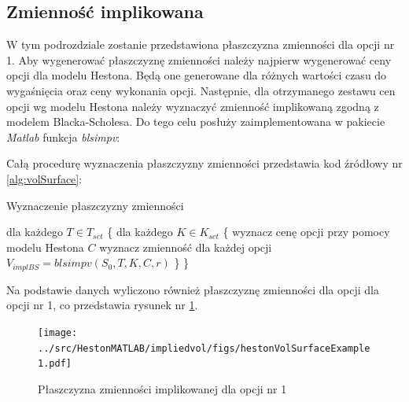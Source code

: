 \documentclass{pracamgr}
\begin{document}
\subsection{Zmienność implikowana}
W tym podrozdziale zostanie przedstawiona płaszczyzna zmienności dla opcji nr 1.
Aby wygenerować płaszczyznę zmienności należy najpierw wygenerować ceny opcji
dla modelu Hestona. Będą one generowane dla różnych wartości czasu do wygaśnięcia 
oraz ceny wykonania opcji. Następnie, dla otrzymanego zestawu cen opcji wg modelu 
Hestona należy wyznaczyć zmienność implikowaną zgodną z modelem Blacka-Scholesa.
Do tego celu posłuży zaimplementowana w pakiecie \textit{Matlab} funkcja \textit{blsimpv}:

Całą procedurę wyznaczenia płaszczyzny zmienności przedstawia kod źródłowy nr \ref{alg:volSurface}:
\begin{algorithm}[H]
\caption{Wyznaczenie płaszczyzny zmienności}\label{euclid}
\begin{algorithmic}[1]
  \State dla każdego $T \in T_{set}$ \{
  \State \hspace{\algorithmicindent} dla każdego $K \in K_{set}$ \{
  \State \hspace{\algorithmicindent} \hspace{\algorithmicindent} wyznacz cenę opcji 
          przy pomocy modelu Hestona $C$
  \State \hspace{\algorithmicindent} \hspace{\algorithmicindent} wyznacz zmienność dla 
          każdej opcji $V_{implBS} = blsimpv(S_0, T, K, C, r)$
  \State \hspace{\algorithmicindent} \}
  \State \} 
\end{algorithmic}
\label{alg:volSurface}
\end{algorithm}
Na podstawie danych wyliczono również płaszczyznę zmienności dla 
opcji dla opcji nr 1, co przedstawia rysunek nr \ref{fig:hestonVolSurfaceExample1}. 

\begin{figure}[ht!]
  \centering
  \texttt{[image: ../src/HestonMATLAB/impliedvol/figs/hestonVolSurfaceExample1.pdf]}
  \caption{Płaszczyzna zmienności implikowanej dla opcji nr 1}
  \label{fig:hestonVolSurfaceExample1}
\end{figure}
\end{document}
